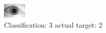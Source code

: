 \begin{figure}[h!]
\begin{center}
\includegraphics[width=0.60\columnwidth]{figures/ID1622_class_3_target_2.png}
\end{center}
\caption{ Classification: 3 actual target: 2}
\label{fig:ID1622_class_3_target_2}
\end{figure}
